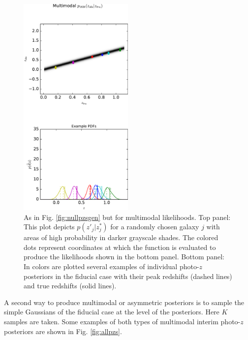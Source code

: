 \documentclass[preprint]{aastex}
\begin{document}
\begin{figure}
\includegraphics[width=0.5\textwidth]{figs/mult/zobsvztru.pdf}
\caption{As in Fig. \ref{fig:nullpzsgen} but for multimodal likelihoods.  Top 
panel: This plot depicts $p(z'_{j}|z^{*}_{j})$ for a randomly chosen galaxy $j$ 
with areas of high probability in darker grayscale shades.  The colored dots 
represent coordinates at which the function is evaluated to produce the 
likelihoods shown in the bottom panel.  Bottom panel: In colors are plotted 
several examples of individual photo-$z$ posteriors in the fiducial case with 
their peak redshifts (dashed lines) and true redshifts (solid lines).}
\label{fig:multpzsgen}
\end{figure}

A second way to produce multimodal or asymmetric posteriors is to sample the 
simple Gaussians of the fiducial case at the level of the posteriors.  Here $K$ 
samples are taken.  Some examples of both types of multimodal interim photo-$z$ 
posteriors are shown in Fig. \ref{fig:allpzs}.  
\end{document}
